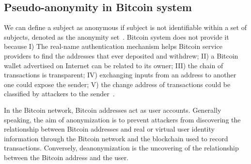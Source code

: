 \subsection{Pseudo-anonymity in Bitcoin system}
We can define a subject as anonymous if subject is not identifiable within a
set of subjects, denoted as the anonymity set~\cite{terminology}. Bitcoin system
does not provide it because I) The real-name authentication mechanism
helps Bitcoin service providers to find the addresses that ever deposited and
withdrew; II) a Bitcoin wallet advertised on Internet can be related to its
owner; III) the chain of transactions is transparent; IV) exchanging inputs
from an address to another one could expose the sender; V) the change address
of transactions could be classified by attackers to the sender~\cite{deanon}.

 In the Bitcoin network,
Bitcoin addresses act as user accounts. Generally speaking, the aim of anonymization is to prevent
attackers from discovering the relationship between Bitcoin addresses and real or virtual user identity
information through the Bitcoin network and the blockchain used to record transactions. Conversely,
deanonymization is the uncovering of the relationship between the Bitcoin address and the user.